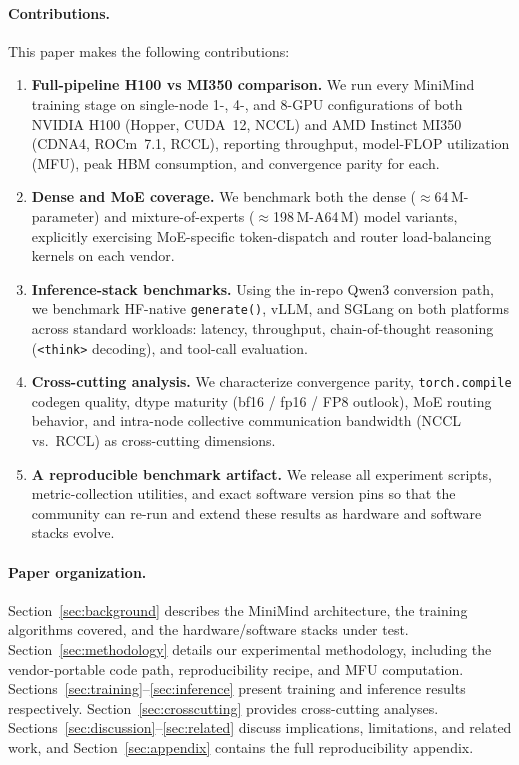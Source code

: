 \paragraph{Contributions.}
This paper makes the following contributions:
\begin{enumerate}[leftmargin=*]
  \item \textbf{Full-pipeline H100 vs MI350 comparison.}  We run every
    MiniMind training stage on single-node 1-, 4-, and 8-GPU configurations of
    both NVIDIA H100 (Hopper, CUDA~12, NCCL) and AMD Instinct MI350 (CDNA4,
    ROCm~7.1, RCCL), reporting throughput, model-FLOP utilization (MFU), peak
    HBM consumption, and convergence parity for each.

  \item \textbf{Dense and MoE coverage.}  We benchmark both the dense
    ($\approx$64\,M-parameter) and mixture-of-experts
    ($\approx$198\,M-A64\,M) model variants, explicitly exercising
    MoE-specific token-dispatch and router load-balancing kernels on each vendor.

  \item \textbf{Inference-stack benchmarks.}  Using the in-repo Qwen3
    conversion path, we benchmark HF-native \texttt{generate()}, vLLM, and
    SGLang on both platforms across standard workloads: latency, throughput,
    chain-of-thought reasoning (\texttt{<think>} decoding), and tool-call
    evaluation.

  \item \textbf{Cross-cutting analysis.}  We characterize convergence parity,
    \texttt{torch.compile} codegen quality, dtype maturity (bf16 / fp16 / FP8
    outlook), MoE routing behavior, and intra-node collective communication
    bandwidth (NCCL vs.\ RCCL) as cross-cutting dimensions.

  \item \textbf{A reproducible benchmark artifact.}  We release all
    experiment scripts, metric-collection utilities, and exact software version
    pins so that the community can re-run and extend these results as hardware
    and software stacks evolve.
\end{enumerate}

\paragraph{Paper organization.}
Section~\ref{sec:background} describes the MiniMind architecture, the training
algorithms covered, and the hardware/software stacks under test.
Section~\ref{sec:methodology} details our experimental methodology, including
the vendor-portable code path, reproducibility recipe, and MFU computation.
Sections~\ref{sec:training}--\ref{sec:inference} present training and inference
results respectively.  Section~\ref{sec:crosscutting} provides cross-cutting
analyses.  Sections~\ref{sec:discussion}--\ref{sec:related} discuss implications,
limitations, and related work, and Section~\ref{sec:appendix} contains the full
reproducibility appendix.
